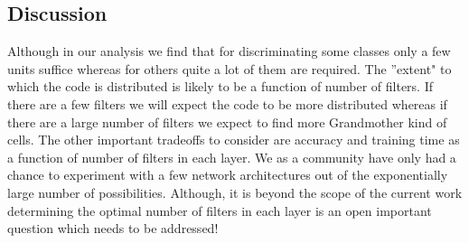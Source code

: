 \subsection{Discussion}
Although in our analysis we find that for discriminating some classes only a few units suffice whereas for others quite a lot of them are required. The ''extent" to which the code is distributed is likely to be a function of number of filters. If there are a few filters we will expect the code to be more distributed whereas if there are a large number of filters we expect to find more Grandmother kind of cells. The other important tradeoffs to consider are accuracy and training time as a function of number of filters in each layer. We as a community have only had a chance to experiment with a few network architectures out of the exponentially large number of possibilities. Although, it is beyond the scope of the current work determining the optimal number of filters in each layer is an open important question which needs to be addressed! 

